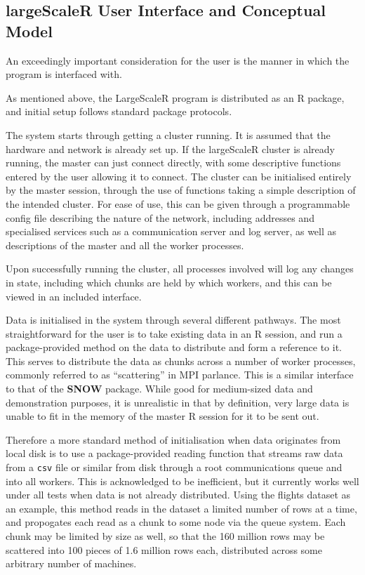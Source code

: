 \subsection{\textbf{largeScaleR} User Interface and Conceptual Model}

An exceedingly important consideration for the user is the manner in which the program is interfaced with.

As mentioned above, the LargeScaleR program is distributed as an R package, and initial setup follows standard package protocols.

The system starts through getting a cluster running.
It is assumed that the hardware and network is already set up.
If the largeScaleR cluster is already running, the master can just connect directly, with some descriptive functions entered by the user allowing it to connect.
The cluster can be initialised entirely by the master session, through the use of functions taking a simple description of the intended cluster.
For ease of use, this can be given through a programmable config file describing the nature of the network, including addresses and specialised services such as a communication server and log server, as well as descriptions of the master and all the worker processes.

Upon successfully running the cluster, all processes involved will log any changes in state, including which chunks are held by which workers, and this can be viewed in an included interface.

Data is initialised in the system through several different pathways.
The most straightforward for the user is to take existing data in an R session, and run a package-provided method on the data to distribute and form a reference to it.
This serves to distribute the data as chunks across a number of worker processes, commonly referred to as ``scattering'' in MPI parlance\cite{walker1996mpi}.
This is a similar interface to that of the \textbf{SNOW} package\cite{tierney18}.
While good for medium-sized data and demonstration purposes, it is unrealistic in that by definition, very large data is unable to fit in the memory of the master R session for it to be sent out.

Therefore a more standard method of initialisation when data originates from local disk is to use a package-provided reading function that streams raw data from a \texttt{csv} file or similar from disk through a root communications queue and into all workers.
This is acknowledged to be inefficient, but it currently works well under all tests when data is not already distributed.
Using the flights dataset as an example, this method reads in the dataset a limited number of rows at a time, and propogates each read as a chunk to some node via the queue system.
Each chunk may be limited by size as well, so that the 160 million rows may be scattered into 100 pieces of 1.6 million rows each, distributed across some arbitrary number of machines.

